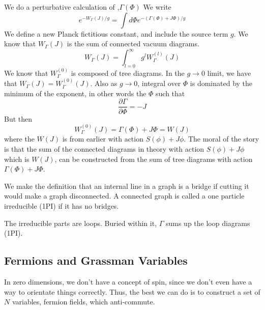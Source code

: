 \documentclass[11pt, oneside]{article}   	%
\theoremstyle{slanted}
\begin{document}
We do a perturbative calculation of ,$ \Gamma \left(  \Phi   \right) $
We write 
\[
	e ^{  - W _{ \Gamma } \left( J  \right)   / g }  = \int d \Phi e ^{ 
	- \left( \Gamma \left(  \Phi  \right)   + J \Phi  \right)   / g } 
\] We define a new Planck fictitious constant, 
and include the source term $ g $. 
We know that 
$ W _{ \Gamma } \left(  J  \right)  $ is the 
sum of connected vacuum diagrams. 
\[
	W _{\Gamma }\left( J  \right) 
	= \int_{ l  =0 } ^{ \infty } g ^ l W _{ \Gamma } ^{ \left(  l  \right)   } 
	\left( J  \right) 
\]  We know that 
$ W  _{ \Gamma } ^{ \left(  0  \right)   }$ 
is composed of tree diagrams. 
In the $ g \to 0 $ limit, 
we have that $ W_{ \Gamma } \left( J  \right)    =  W_{ \Gamma } ^{ \left(  0  \right)  } 
\left( J  \right)  $. 
Also as $ g \to 0 $, integral over $ \Phi $ is 
dominated by the minimum of the exponent, 
in other words the $ \Phi $ such that 
\[
 \frac{\partial  \Gamma }{\partial  \Phi }   =  - J 
\]  But then 
\[
	W _{ \Gamma } ^{ \left(  0  \right)  } \left(  J \right)   = 
	\Gamma ( \Phi ) + J \Phi  = W \left( J  \right)  
\] where the $ W ( J ) $ is from earlier 
with action  $ S ( \phi  )  + J \phi  $. 
The moral of the 
story is that the sum of the connected diagrams 
in theory with action $ S( \phi  ) + J \phi  $ 
which is  $ W( J  )  $, can 
be constructed from the sum of tree diagrams with action  $ \Gamma \left( \Phi  \right)  
+ J \Phi $.

We make the definition that an internal line in  a graph 
is a bridge if cutting it 
would make a graph disconnected. 
A connected graph is called a 
one particle irreducible (1PI)
if it has no bridges. 

The irreducible parts are loops. 
Buried within it, 
$ \Gamma $ sums up the loop diagrams (1PI). 

\subsection{Fermions and Grassman Variables}
In zero dimensions, 
we don't have a concept of spin, 
since we don't even have a way to 
orientate things correctly. 
Thus, the best we can do is 
to construct a set of $ N $ variables, 
fermion fields, which anti-commute. 
\end{document}
